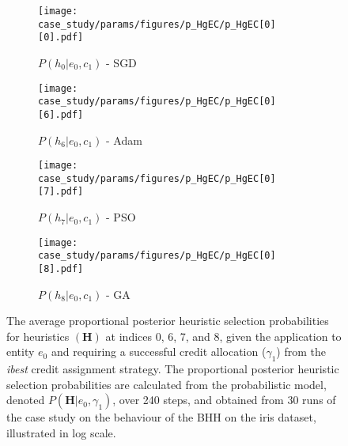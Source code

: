 \begin{figure}[htb]
      \begin{subfigure}{0.5\textwidth}
            \centering
            \texttt{[image: case\_study/params/figures/p\_HgEC/p\_HgEC[0][0].pdf]}
            \caption{$P(h_{0} \vert e_{0}, c_{1})$ - \acs{SGD}}
            \label{fig:results:case_study:p_HgEC:0:0}
      \end{subfigure}
      \begin{subfigure}{0.5\textwidth}
            \centering
            \texttt{[image: case\_study/params/figures/p\_HgEC/p\_HgEC[0][6].pdf]}
            \caption{$P(h_{6} \vert e_{0}, c_{1})$ - \acs{Adam}}
            \label{fig:results:case_study:p_HgEC:0:6}
      \end{subfigure}
      \par\bigskip
      \begin{subfigure}{0.5\textwidth}
            \centering
            \texttt{[image: case\_study/params/figures/p\_HgEC/p\_HgEC[0][7].pdf]}
            \caption{$P(h_{7} \vert e_{0}, c_{1})$ - \acs{PSO}}
            \label{fig:results:case_study:p_HgEC:0:7}
      \end{subfigure}
      \begin{subfigure}{0.5\textwidth}
            \centering
            \texttt{[image: case\_study/params/figures/p\_HgEC/p\_HgEC[0][8].pdf]}
            \caption{$P(h_{8} \vert e_{0}, c_{1})$ - \acs{GA}}
            \label{fig:results:case_study:p_HgEC:0:8}
      \end{subfigure}
      \par\bigskip
      \caption{The average proportional posterior heuristic selection probabilities for heuristics $(\boldsymbol{H})$ at indices 0, 6, 7, and 8, given the application to entity $e_{0}$ and requiring a successful credit allocation ($\gamma_{1}$) from the \textit{ibest} credit assignment strategy. The proportional posterior heuristic selection probabilities are calculated from the probabilistic model, denoted $P(\boldsymbol{H} \vert e_{0}, \gamma_{1})$, over 240 steps, and obtained from 30 runs of the case study on the behaviour of the \acs{BHH} on the iris dataset, illustrated in log scale.}
      \label{fig:results:case_study:p_HgEC:0}
\end{figure}


